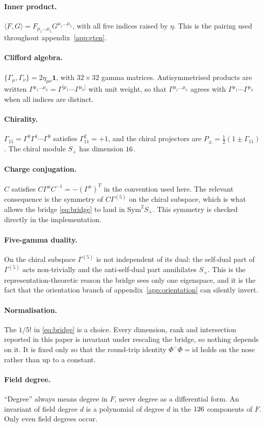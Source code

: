 \paragraph{Inner product.}
$\langle F, G\rangle = F_{\mu_1\dots\mu_5}G^{\mu_1\dots\mu_5}$, with all five
indices raised by $\eta$. This is the pairing used throughout
appendix~\ref{app:gten}.

\paragraph{Clifford algebra.}
$\{\Gamma_\mu, \Gamma_\nu\} = 2\eta_{\mu\nu}\mathbf{1}$, with
$32\times 32$ gamma matrices. Antisymmetrised products are written
$\Gamma^{\mu_1\dots\mu_k} = \Gamma^{[\mu_1}\cdots\Gamma^{\mu_k]}$ with unit
weight, so that $\Gamma^{\mu_1\dots\mu_k}$ agrees with
$\Gamma^{\mu_1}\cdots\Gamma^{\mu_k}$ when all indices are distinct.

\paragraph{Chirality.}
$\Gamma_{11} = \Gamma^0\Gamma^1\cdots\Gamma^9$ satisfies $\Gamma_{11}^2 = +1$,
and the chiral projectors are $P_\pm = \tfrac12(1\pm\Gamma_{11})$. The chiral
module $S_+$ has dimension $16$.

\paragraph{Charge conjugation.}
$C$ satisfies $C\Gamma^\mu C^{-1} = -(\Gamma^\mu)^{T}$ in the convention used
here. The relevant consequence is the symmetry of $C\Gamma^{(5)}$ on the chiral
subspace, which is what allows the bridge \eqref{eq:bridge} to land in
$\mathrm{Sym}^2 S_+$. This symmetry is checked directly in the implementation.

\paragraph{Five-gamma duality.}
On the chiral subspace $\Gamma^{(5)}$ is not independent of its dual: the
self-dual part of $\Gamma^{(5)}$ acts non-trivially and the anti-self-dual part
annihilates $S_+$. This is the representation-theoretic reason the bridge sees
only one eigenspace, and it is the fact that the orientation branch of
appendix~\ref{app:orientation} can silently invert.

\paragraph{Normalisation.}
The $1/5!$ in \eqref{eq:bridge} is a choice. Every dimension, rank and
intersection reported in this paper is invariant under rescaling the bridge, so
nothing depends on it. It is fixed only so that the round-trip identity
$\Phi^-\Phi = \mathrm{id}$ holds on the nose rather than up to a constant.

\paragraph{Field degree.}
``Degree'' always means degree in $F$, never degree as a differential form. An
invariant of field degree $d$ is a polynomial of degree $d$ in the
$126$ components of $F$. Only even field degrees occur.
